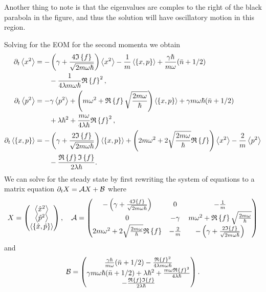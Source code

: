 Another thing to note is that the eigenvalues are comples to the right of the black parabola in the figure, and thus the solution will have oscillatory motion in this region.

Solving for the EOM for the second momenta we obtain
\begin{align}
    \dt \expval{x^2} &= -\left(\gamma + \frac{4\im{f}}{\sqrt{2 m \omega \hbar}}\right) \expval{x^2} - \frac{1}{m} \expval{\acomm{x}{p}} + \frac{\gamma \hbar}{m \omega} (\nbar + 1/2) \nonumber\\
    &\qquad - \frac{1}{4\lambda m \omega \hbar} \re{f}^2,\\
    \dt \expval{p^2} &=  -\gamma \expval{p^2} + \left( m\omega^2 + \re{f} \sqrt{\frac{2m \omega}{\hbar}} \right)\expval{\acomm{x}{p}} + \gamma m \omega \hbar (\nbar + 1/2) \nonumber \\
    &\qquad+ \lambda \hbar^2 + \frac{m \omega}{4 \lambda \hbar}\re{f}^2 ,\\
    \dt \expval{\acomm{x}{p}} &= -\left(\gamma + \frac{2\im{f}}{\sqrt{2m \omega \hbar}}  \right)\expval{\acomm{x}{p}} + \left(2 m \omega^2 + 2 \sqrt{\frac{2 m \omega}{\hbar}}\re{f} \right) \expval{x^2} - \frac{2}{m} \expval{p^2}\nonumber\\ 
    &\qquad - \frac{\re{f} \im{f}}{2 \lambda \hbar}.
\end{align}
We can solve for the steady state by first rewriting the system of equations to a matrix equation $\partial_t X = \mathcal{A} X + \mathcal{B}$ where
\begin{equation}
    X =
    \begin{pmatrix}
        \expval{\xop^2}\\
        \expval{\pop^2}\\
        \expval{\acomm{\xop}{\pop}}    
    \end{pmatrix}, \quad
    \mathcal{A} = \begin{pmatrix}
        -\left(\gamma + \frac{4\im{f}}{\sqrt{2 m \omega \hbar}}\right) & 0 & -\frac{1}{m} \\
        0 & -\gamma & m\omega^2 + \re{f} \sqrt{\frac{2m \omega}{\hbar}} \\
        2 m \omega^2 + 2 \sqrt{\frac{2 m \omega}{\hbar}}\re{f} & -\frac{2}{m} & -\left(\gamma +\frac{2\im{f}}{\sqrt{2m \omega \hbar}}\right) \label{eq:matrixA}
    \end{pmatrix}
\end{equation}
and
\begin{equation}
    \mathcal{B} = 
    \begin{pmatrix}
        \frac{\gamma \hbar}{m \omega} (\bar{n} + 1/2) - \frac{\mathfrak{R}\left\{f\right\}^2}{4\lambda m \omega \hbar}\\
        \gamma m \omega \hbar (\bar{n} + 1/2) + \lambda \hbar^2 +\frac{m \omega \mathfrak{R}\left\{f\right\}^2}{4 \lambda \hbar}\\
        -\frac{\mathfrak{R}\left\{f\right\} \mathfrak{I}\left\{f\right\}}{2 \lambda \hbar}
    \end{pmatrix}.
\end{equation}
